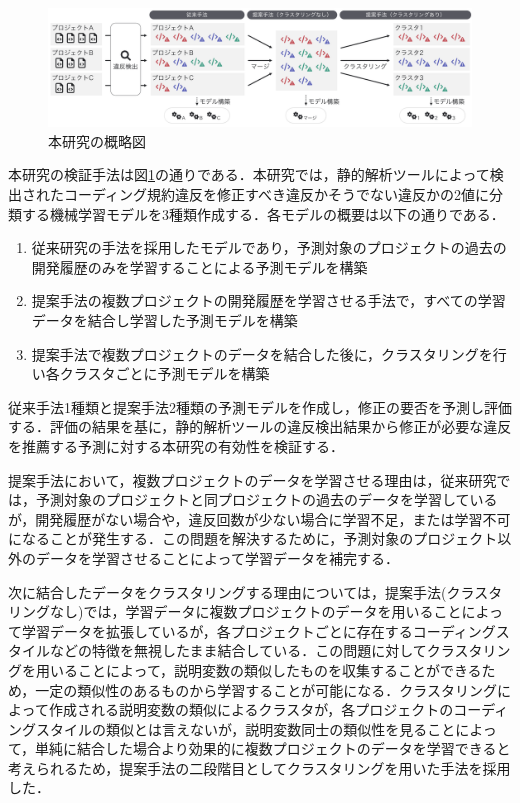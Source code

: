 \documentclass[11pt,dvipdfmx]{jreport}
\begin{document}
\begin{figure}[t]
	\centering
	\includegraphics[width=1.0\linewidth]{Kameoka_fig/kameoka_fig1.pdf}
	\caption{本研究の概略図}
	\label{fig:Teiannsyuhou}
\end{figure}

本研究の検証手法は図\ref{fig:Teiannsyuhou}の通りである．本研究では，静的解析ツールによって検出されたコーディング規約違反を修正すべき違反かそうでない違反かの2値に分類する機械学習モデルを3種類作成する．各モデルの概要は以下の通りである．

\begin{enumerate}
  \item 従来研究の手法を採用したモデルであり，予測対象のプロジェクトの過去の開発履歴のみを学習することによる予測モデルを構築
  \item 提案手法の複数プロジェクトの開発履歴を学習させる手法で，すべての学習データを結合し学習した予測モデルを構築
  \item 提案手法で複数プロジェクトのデータを結合した後に，クラスタリングを行い各クラスタごとに予測モデルを構築
\end{enumerate}

従来手法1種類と提案手法2種類の予測モデルを作成し，修正の要否を予測し評価する．評価の結果を基に，静的解析ツールの違反検出結果から修正が必要な違反を推薦する予測に対する本研究の有効性を検証する．

提案手法において，複数プロジェクトのデータを学習させる理由は，従来研究では，予測対象のプロジェクトと同プロジェクトの過去のデータを学習しているが，開発履歴がない場合や，違反回数が少ない場合に学習不足，または学習不可になることが発生する．この問題を解決するために，予測対象のプロジェクト以外のデータを学習させることによって学習データを補完する．

次に結合したデータをクラスタリングする理由については，提案手法(クラスタリングなし)では，学習データに複数プロジェクトのデータを用いることによって学習データを拡張しているが，各プロジェクトごとに存在するコーディングスタイルなどの特徴を無視したまま結合している．この問題に対してクラスタリングを用いることによって，説明変数の類似したものを収集することができるため，一定の類似性のあるものから学習することが可能になる．クラスタリングによって作成される説明変数の類似によるクラスタが，各プロジェクトのコーディングスタイルの類似とは言えないが，説明変数同士の類似性を見ることによって，単純に結合した場合より効果的に複数プロジェクトのデータを学習できると考えられるため，提案手法の二段階目としてクラスタリングを用いた手法を採用した．
\end{document}
